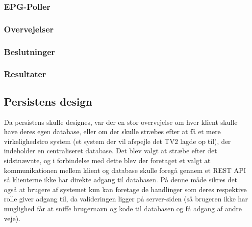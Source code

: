 \subsubsection{EPG-Poller}
\subsubsection{Overvejelser}
\subsubsection{Beslutninger}
\subsubsection{Resultater}


\subsection{Persistens design}
Da persistens skulle designes, var der en stor overvejelse om hver klient skulle have deres egen database, eller om der skulle stræbes efter at få et mere virkelighedstro system (et system der vil afspejle det TV2 lagde op til), der indeholder en centraliseret database. Det blev valgt at stræbe efter det sidstnævnte, og i forbindelse med dette blev der foretaget et valgt at kommunikationen mellem klient og database skulle foregå gennem et REST API så klienterne ikke har direkte adgang til databasen. På denne måde sikres det også at brugere af systemet kun kan foretage de handlinger som deres respektive rolle giver adgang til, da valideringen ligger på server-siden (så brugeren ikke har muglighed får at sniffe brugernavn og kode til databasen og få adgang af andre veje).